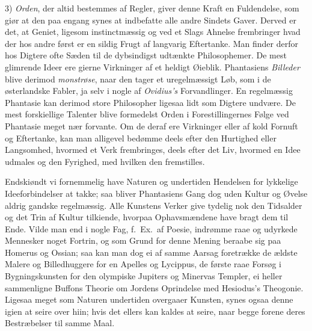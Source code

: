 \documentclass[12pt,a4paper]{article}
\newcommand{\opage}[1]{\marginnote{\footnotesize\textit{[#1]}}}
\begin{document}
3) \emph{Orden}, der altid bestemmes af Regler, giver denne Kraft en Fuldendelse, som
giør at den paa engang synes at indbefatte alle andre Sindets Gaver. Derved er det, at
Geniet, ligesom instinctmæssig og ved et Slags Ahnelse frembringer hvad der hos andre
først er en sildig Frugt af langvarig Eftertanke. Man finder derfor hos Digtere ofte
Sæden til de dybsindigst udtænkte Philosophemer. De mest glimrende Ideer ere gierne
Virkninger af et heldigt Øieblik. Phantasiens \emph{Billeder} blive derimod
\emph{monstrøse}, naar den tager et uregelmæssigt Løb, som i de østerlandske Fabler, ja
selv i nogle af \emph{Ovidius's} Forvandlinger. En regelmæssig Phantasie kan derimod
store Philosopher ligesaa lidt som Digtere undvære. De mest forskiellige Talenter
\opage{125} blive formedelst Orden i Forestillingernes Følge ved Phantasie meget nær forvante. Om de
deraf ere Virkninger eller af kold Fornuft og Eftertanke, kan man alligevel bedømme deels
efter den Hurtighed eller Langsomhed, hvormed et Verk frembringes, deels efter det Liv,
hvormed en Idee udmales og den Fyrighed, med hvilken den fremstilles.

Endskiøndt vi fornemmelig have Naturen og undertiden Hendelsen for lykkelige
Ideeforbindelser at takke; saa bliver Phantasiens Gang dog uden Kultur og Øvelse aldrig
gandske regelmæssig. Alle Kunstens Verker give tydelig nok den Tidsalder og det Trin af
Kultur tilkiende, hvorpaa Ophavsmændene have bragt dem til Ende. Vilde man end i nogle
Fag, f.~Ex.\ af Poesie, indrømme raae og udyrkede Mennesker noget Fortrin, og som Grund
for denne Mening beraabe sig paa Homerus og Ossian; saa kan man dog ei af samme Aarsag
foretrække de ældste Malere og Billedhuggere for en Apelles og Lycippus, de første raae
Forsøg i Bygningskunsten for den olympiske Jupiters og Minervas Templer, ei heller
sammenligne Buffons Theorie om Jordens Oprindelse med Hesiodus's Theogonie. Ligesaa meget
som Naturen undertiden overgaaer Kunsten, synes ogsaa denne igien at seire over hiin;
hvis det ellers kan kaldes at seire, naar begge forene deres Bestræbelser til samme Maal.
\end{document}
